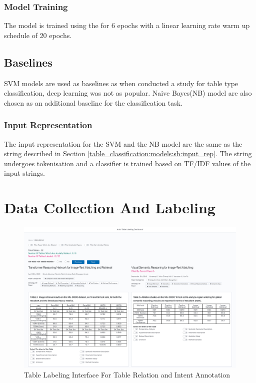 \subsubsection{Model Training}
The model is trained using the for 6 epochs with a linear learning rate warm up schedule of 20 epochs.

\subsection{Baselines}
SVM models are used as baselines as when \cite{kim2012scientific} conducted a study for table type classification, deep learning was not as popular. Naive Bayes(NB) model are also chosen as an additional baseline for the classification task. 

\subsubsection{Input Representation}
The input representation for the SVM and the NB model are the same as the string described in Section \ref{table_classification:models:sb:input_rep}. The string undergoes tokenisation and a classifier is trained based on TF/IDF values of the input strings. 


\section{Data Collection And Labeling}
\label{table_classification:data-coll}

\begin{figure}[h]
    \centering
    \includegraphics[width=\maxwidth{\textwidth}]{src/images/table-label-interface.png}
    \caption{Table Labeling Interface For Table Relation and Intent Annotation}
    \label{figure\arabic{figurecounter}}
\end{figure}


